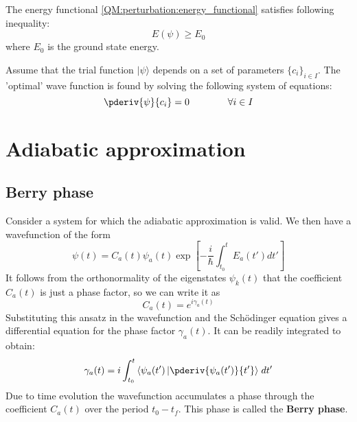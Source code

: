 
	\begin{property}
    		The energy functional \ref{QM:perturbation:energy_functional} satisfies following inequality:
        	\begin{equation}
        		E(\psi) \geq E_0
        	\end{equation}
        	where $E_0$ is the ground state energy.
	\end{property}
    
	\begin{method}
	    	Assume that the trial function $|\psi\rangle$ depends on a set of parameters $\{c_i\}_{i\in I}$. The 'optimal' wave function is found by solving the following system of equations:
	        \begin{equation}
	        	\pderiv{\psi}{c_i} = 0\qquad\qquad\forall i\in I
	        \end{equation}
	\end{method}
    
\section{Adiabatic approximation}
\subsection{Berry phase}

    	Consider a system for which the adiabatic approximation is valid. We then have a wavefunction of the form
        \begin{equation}
        	\psi(t) = C_a(t)\psi_a(t)\exp\left[-\frac{i}{\hbar}\int_{t_0}^tE_a(t')dt'\right]
        \end{equation}
    	It follows from the orthonormality of the eigenstates $\psi_k(t)$ that the coefficient $C_a(t)$ is just a phase factor, so we can write it as
        \begin{equation}
        	C_a(t) = e^{i\gamma_a(t)}
        \end{equation}
        Substituting this ansatz in the wavefunction and the Sch\"odinger equation gives a differential equation for the phase factor $\gamma_a(t)$. It can be readily integrated to obtain:
        \begin{equation}
        	\label{QM:perturbation:berry:phase_factor}
        	\gamma_a(t) = i\int_{t_0}^t\left\langle\psi_a(t')\left|\pderiv{\psi_a(t')}{t'}\right\rangle\right. dt'
        \end{equation}
        Due to time evolution the wavefunction accumulates a phase through the coefficient $C_a(t)$ over the period $t_0-t_f$. This phase is called the \textbf{Berry phase}.
        
